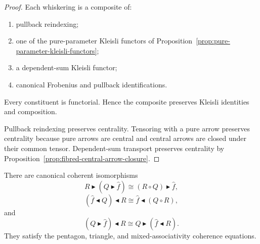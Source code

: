 \begin{proof}
Each whiskering is a composite of:
\begin{enumerate}
    \item pullback reindexing;
    \item one of the pure-parameter Kleisli functors of
    Proposition~\ref{prop:pure-parameter-kleisli-functors};
    \item a dependent-sum Kleisli functor;
    \item canonical Frobenius and pullback identifications.
\end{enumerate}
Every constituent is functorial.  Hence the composite preserves Kleisli
identities and composition.

Pullback reindexing preserves centrality.  Tensoring with a pure arrow
preserves centrality because pure arrows are central and central arrows are
closed under their common tensor.  Dependent-sum transport preserves
centrality by
Proposition~\ref{prop:fibred-central-arrow-closure}.
\end{proof}

\begin{proposition}
\label{prop:coherence-pure-span-whiskering}
There are canonical coherent isomorphisms
\[
    R\blacktriangleright
    (Q\blacktriangleright\widehat f)
    \cong
    (R\circ Q)\blacktriangleright\widehat f,
\]
\[
    (\widehat f\blacktriangleleft Q)
    \blacktriangleleft R
    \cong
    \widehat f\blacktriangleleft(Q\circ R),
\]
and
\[
    (Q\blacktriangleright\widehat f)
    \blacktriangleleft R
    \cong
    Q\blacktriangleright
    (\widehat f\blacktriangleleft R).
\]
They satisfy the pentagon, triangle, and mixed-associativity coherence
equations.
\end{proposition}

